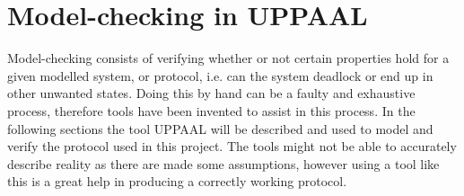 \chapter{Model-checking in UPPAAL}
Model-checking consists of verifying whether or not certain properties hold for a given modelled system, or protocol, i.e. can the system deadlock or end up in other unwanted states.
Doing this by hand can be a faulty and exhaustive process, therefore tools have been invented to assist in this process. In the following sections the tool UPPAAL will be described and used to model and verify the protocol used in this project. 
The tools might not be able to accurately describe reality as there are made some assumptions, however using a tool like this is a great help in producing a correctly working protocol. 


